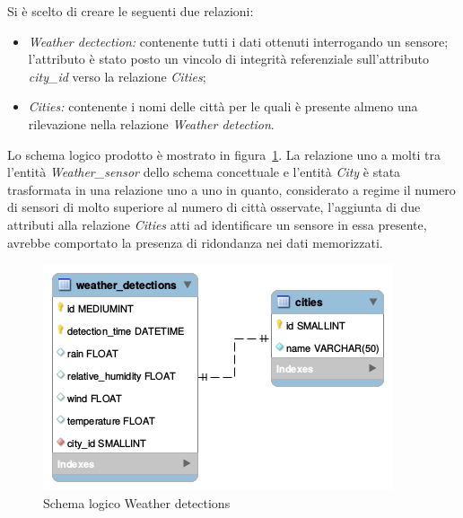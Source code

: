 Si è scelto di creare le seguenti due relazioni:
\begin{itemize}
\item \textit{Weather dectection:} contenente tutti i dati ottenuti interrogando un sensore;
l'attributo è stato posto un vincolo di integrità referenziale sull'attributo
\textit{city\_id} verso la relazione \textit{Cities};
\item \textit{Cities:} contenente i nomi delle città per le quali è presente almeno una
rilevazione nella relazione \textit{Weather detection}.
\end{itemize}
Lo schema logico prodotto è mostrato in figura~\ref{fig:weather_detection_logic}.
La relazione uno a molti tra l'entità \textit{Weather\_sensor} dello schema concettuale e
l'entità \textit{City} è stata trasformata in una relazione uno a uno in quanto, considerato 
a regime il numero di sensori di molto superiore al numero di città osservate, l'aggiunta di
due attributi alla relazione \textit{Cities} atti ad identificare un sensore in essa presente,
avrebbe comportato la presenza di ridondanza nei dati memorizzati.

\begin{figure}[H]                                                                                                                                                            
\centering                                                                                                                                                                   
\includegraphics{diagrams/weather_detection_logic}                                                                                                                                   
\caption{Schema logico Weather detections}                                                                                                                                            
\label{fig:weather_detection_logic}                                                                                                                                                           
\end{figure}


